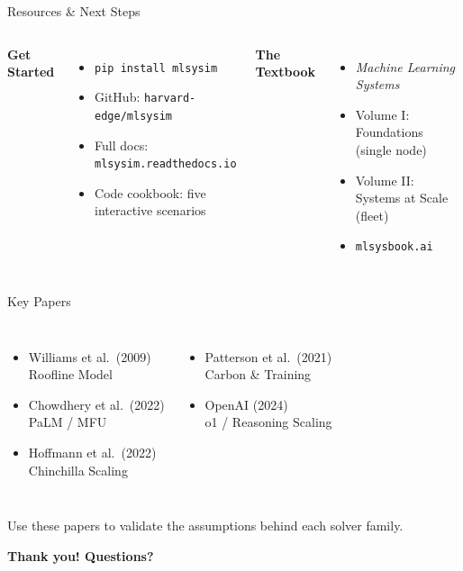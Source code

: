 \documentclass[aspectratio=169, 12pt]{beamer}
\begin{document}
\begin{frame}{Resources \& Next Steps}
\begin{columns}[T]
\textbf{Get Started}
\begin{itemize}
  \item \texttt{pip install mlsysim}
  \item GitHub: \texttt{harvard-edge/mlsysim}
  \item Full docs: \texttt{mlsysim.readthedocs.io}
  \item Code cookbook: five interactive scenarios
\end{itemize}

\textbf{The Textbook}
\begin{itemize}
  \item \emph{Machine Learning Systems}
  \item Volume I: Foundations (single node)
  \item Volume II: Systems at Scale (fleet)
  \item \texttt{mlsysbook.ai}
\end{itemize}
\end{columns}
\end{frame}

\begin{frame}{Key Papers}
\begin{columns}[T]
\begin{itemize}
  \item Williams et al.\ (2009)\\
        {\footnotesize Roofline Model}
  \item Chowdhery et al.\ (2022)\\
        {\footnotesize PaLM / MFU}
  \item Hoffmann et al.\ (2022)\\
        {\footnotesize Chinchilla Scaling}
\end{itemize}

\begin{itemize}
  \item Patterson et al.\ (2021)\\
        {\footnotesize Carbon \& Training}
  \item OpenAI (2024)\\
        {\footnotesize o1 / Reasoning Scaling}
\end{itemize}
\end{columns}
\vfill
\begin{center}
\large Use these papers to validate the assumptions behind each solver family.
\end{center}
\end{frame}

\begin{frame}[c]{}
\centering
\Large\bfseries Thank you! Questions?
\end{frame}
\end{document}
